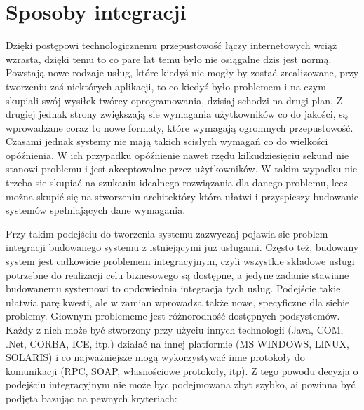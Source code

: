 \section{Sposoby integracji}
Dzięki postępowi technologicznemu przepustowość łączy internetowych wciąż wzrasta, dzięki temu to co pare lat temu było nie osiągalne dzis jest normą. Powstają nowe rodzaje usług, które kiedyś nie mogły by zostać zrealizowane, przy tworzeniu zaś niektórych aplikacji, to co kiedyś było problemem i na czym skupiali swój wysiłek twórcy oprogramowania, dzisiaj schodzi na drugi plan. Z drugiej jednak strony zwiększają sie wymagania użytkowników co do jakości, są wprowadzane coraz to nowe formaty, które wymagają ogromnych przepustowość. Czasami jednak systemy nie mają takich scisłych wymagań co do wielkości opóźnienia. W ich przypadku opóźnienie nawet rzędu kilkudziesięciu sekund nie stanowi problemu i jest akceptowalne przez użytkowników. W takim wypadku nie trzeba sie skupiać na szukaniu idealnego rozwiązania dla danego problemu, lecz można skupić się na stworzeniu architektóry która ułatwi i przyspieszy budowanie systemów spełniających dane wymagania.

Przy takim podejściu do tworzenia systemu zazwyczaj pojawia sie problem integracji budowanego systemu z istniejącymi już usługami. Często też, budowany system jest całkowicie problemem integracyjnym, czyli wszystkie składowe usługi potrzebne do realizacji celu biznesowego są dostępne, a jedyne zadanie stawiane budowanemu systemowi to opdowiednia integracja tych usług. Podejście takie ułatwia parę kwesti, ale w zamian wprowadza także nowe, specyficzne dla siebie problemy. Głownym problememe jest różnorodność dostępnych podsystemów. Każdy z nich może być stworzony przy użyciu innych technologii (Java, COM, .Net, CORBA, ICE, itp.) działać na innej platformie (MS WINDOWS, LINUX, SOLARIS) i co najważniejsze mogą wykorzystywać inne protokoły do komunikacji (RPC, SOAP, własnościowe protokoły, itp). Z tego powodu decyzja o podejściu integracyjnym nie może byc podejmowana zbyt szybko, ai powinna być podjęta bazując na pewnych kryteriach:  \cite{hohpewoolf2003} 

